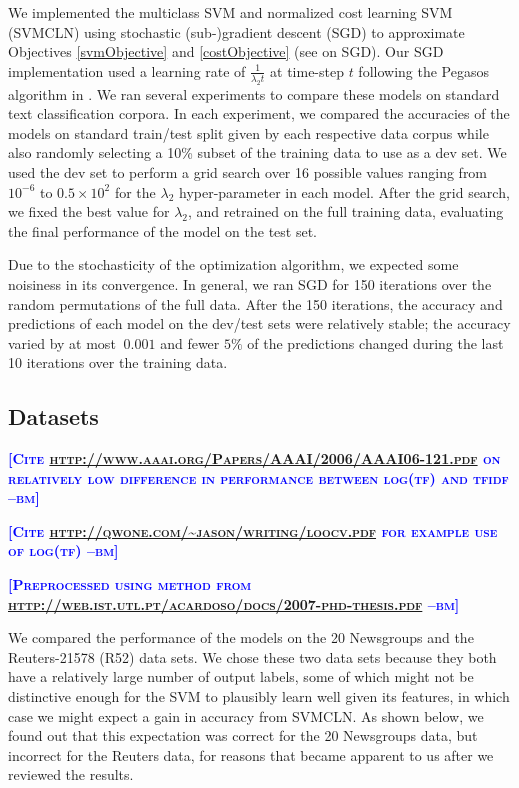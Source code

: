 \documentclass{article} %
\newcommand{\bmcomment}[1]{\textcolor{blue}{\textsc{\textbf{[#1 --bm]}}}}
\begin{document}
We implemented the multiclass SVM and normalized cost learning SVM (SVMCLN) 
using stochastic (sub-)gradient descent (SGD) to approximate Objectives
\ref{svmObjective} and \ref{costObjective} (see \citep{yin2003stochastic} on
SGD).  Our SGD implementation
used a learning rate of $\frac{1}{\lambda_2 t}$ at time-step $t$ 
following the Pegasos algorithm in \citep{shalev2011pegasos}.
We ran several experiments to compare these models on standard
text classification corpora.  In each experiment, we compared 
the accuracies of the models on standard train/test split 
given by each respective
data corpus while also randomly selecting a 10\% subset of the 
training data to use as a dev set.  We used the dev set to perform
a grid search over 16 possible values ranging from $10^{-6}$ to 
$0.5\times 10^2$ for the $\lambda_2$ hyper-parameter in each model.
After the grid search, we fixed the best value for $\lambda_2$,
and retrained on the full training data,
evaluating the final performance of the model on the test set.  
 
Due to the stochasticity of the optimization algorithm, we 
expected some noisiness in its convergence.  In general, we 
ran SGD for 150 iterations over the random permutations
of the full data. After the 150 iterations, the accuracy and 
predictions of each model on the dev/test sets were relatively 
stable; the accuracy varied by at most $~0.001$ and 
fewer $5\%$ of the predictions changed 
during the last 10 iterations over the training 
data. 

\subsection{Datasets}

\bmcomment{Cite \url{http://www.aaai.org/Papers/AAAI/2006/AAAI06-121.pdf}
on relatively low difference in performance between log(tf) and tfidf}

\bmcomment{Cite \url{http://qwone.com/~jason/writing/loocv.pdf} for 
example use of log(tf)}

\bmcomment{Preprocessed using method from 
\url{http://web.ist.utl.pt/acardoso/docs/2007-phd-thesis.pdf}}

We compared the performance of the models on the 20 Newsgroups and
the Reuters-21578 (R52) data sets.  We chose these two data sets
because they both have a relatively large number of output labels,
some of which might not be distinctive enough for the SVM to plausibly
learn well given its features, in which case we might expect a gain in 
accuracy from SVMCLN.  As shown below, we found out that this 
expectation was correct for the 20 Newsgroups data, but incorrect for 
the Reuters data, for reasons that became apparent to us after we
reviewed the results.
\end{document}
